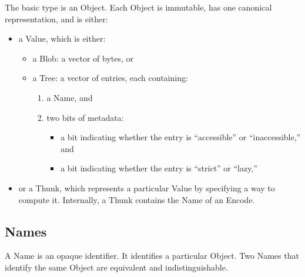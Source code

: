 \documentclass{article}
\newcommand{\blob}{\textrm{Blob}\xspace}
\newcommand{\valuex}{\textrm{Value}\xspace}
\newcommand{\object}{\textrm{Object}\xspace}
\newcommand{\encode}{\textrm{Encode}\xspace}
\newcommand{\thunk}{\textrm{Thunk}\xspace}
\newcommand{\name}{\textrm{Name}\xspace}
\newcommand{\names}{\textrm{Name}s\xspace}
\newcommand{\tree}{\textrm{Tree}\xspace}
\begin{document}
The basic type is an \object. Each \object is immutable, has one canonical representation, and is either:

\begin{itemize}[itemsep=0pt]
\item a \valuex, which is either:
\begin{itemize}[itemsep=0pt]
  \item a \blob: a vector of bytes, or

  \item a \tree: a vector of entries, each containing:

    \begin{enumerate}[topsep=0pt, itemsep=0pt]
    \item a \name, and
    \item two bits of metadata:
      \begin{itemize}
      \item a bit indicating whether the entry is ``accessible'' or ``inaccessible,'' and
      \item a bit indicating whether the entry is ``strict'' or ``lazy,''
      \end{itemize}
      \end{enumerate}
\end{itemize}

\item or a \thunk, which represents a particular \valuex by specifying
  a way to compute it. Internally, a \thunk contains the \name of an \encode.
\end{itemize}


\subsection{\names}

A \name is an opaque identifier. It identifies a particular
\object. Two \names that identify the same \object are equivalent and
indistinguishable.

\end{document}
